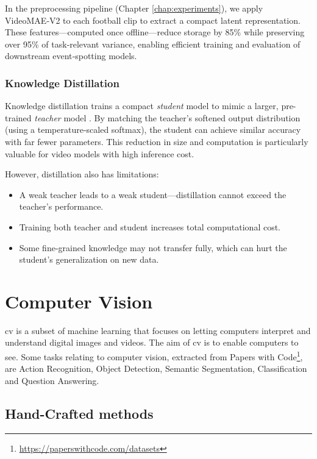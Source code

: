 In the preprocessing pipeline (Chapter \ref{chap:experiments}), we apply VideoMAE‑V2 to each football clip to extract a compact latent representation. These features—computed once offline—reduce storage by 85\% while preserving over 95\% of task‑relevant variance, enabling efficient training and evaluation of downstream event‑spotting models.


\subsubsection{Knowledge Distillation}
\label{sssec:knowledge_distillation}

Knowledge distillation trains a compact \emph{student} model to mimic a larger, pre-trained \emph{teacher} model \cite{denize_comedian_2024, li_videomamba_2024, bose_soccerkdnet_2023}. By matching the teacher’s softened output distribution (using a temperature-scaled softmax), the student can achieve similar accuracy with far fewer parameters. This reduction in size and computation is particularly valuable for video models with high inference cost.

However, distillation also has limitations:
\begin{itemize}
    \item A weak teacher leads to a weak student—distillation cannot exceed the teacher’s performance.
    \item Training both teacher and student increases total computational cost.
    \item Some fine-grained knowledge may not transfer fully, which can hurt the student’s generalization on new data.
\end{itemize}


\section{Computer Vision} 
\label{sec:computer_vision}

\acrfull{cv} is a subset of machine learning that focuses on letting computers interpret and understand digital images and videos. The aim of \acrlong{cv} is to enable computers to see. Some tasks relating to computer vision, extracted from Papers with Code\footnote{\url{https://paperswithcode.com/datasets}}, are Action Recognition, Object Detection, Semantic Segmentation, Classification and Question Answering. 

\subsection{Hand-Crafted methods}

